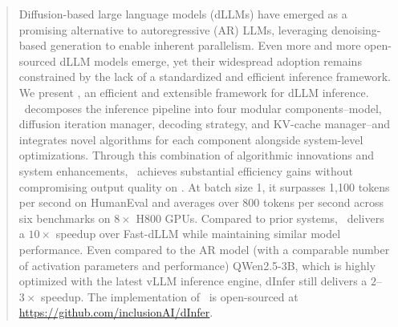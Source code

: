 \begin{abstract}

Diffusion-based large language models (dLLMs) have emerged as a promising alternative to autoregressive (AR) LLMs, leveraging denoising-based generation to enable inherent parallelism. Even more and more open-sourced dLLM models emerge, yet their widespread adoption remains constrained by  the lack of a standardized and efficient inference framework. We present \sys, an efficient and extensible framework for dLLM inference. \sys~decomposes the inference pipeline into four modular components--model, diffusion iteration manager, decoding strategy, and KV-cache manager--and integrates novel algorithms for each component alongside system-level optimizations.
Through this combination of algorithmic innovations and system enhancements, \sys~achieves substantial efficiency gains without compromising output quality on \lladamoe. At batch size 1, it surpasses 1,100 tokens per second on HumanEval and averages over 800 tokens per second across six benchmarks on $8\times$ H800 GPUs. Compared to prior systems, \sys~delivers a $10\times$ speedup over Fast-dLLM while maintaining similar model performance.
Even compared to the AR model (with a comparable number of activation parameters and performance) QWen2.5-3B, which is highly optimized with the latest vLLM inference engine, dInfer still delivers a $2$–$3\times$ speedup. The implementation of \sys~is open-sourced at \url{https://github.com/inclusionAI/dInfer}.
\end{abstract}
